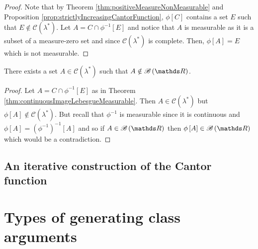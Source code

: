 \begin{proof}
Note that by Theorem \ref{thm:positiveMeasureNonMeasurable} and Proposition
\ref{prop:strictlyIncreasingCantorFunction}, $\phi\left[C\right]$
contains a set $E$ such that $E\notin\mathcal{C}\left(\lambda^{*}\right).$
Let $A=C\cap\phi^{-1}\left[E\right]$ and notice that $A$ is measurable
as it is a subset of a measure-zero set and since $\mathcal{C}\left(\lambda^{*}\right)$
is complete. Then, $\phi\left[A\right]=E$ which is not measurable.
\end{proof}
\begin{cor}
\label{cor:lebesgueNotBorel}There exists a set $A\in\mathcal{C}\left(\lambda^{*}\right)$
such that $A\notin\borel\left(\R\right)$.
\end{cor}

\begin{proof}
Let $A=C\cap\phi^{-1}\left[E\right]$ as in Theorem \ref{thm:continuousImageLebesgueMeasurable}.
Then $A\in\mathcal{C}\left(\lambda^{*}\right)$ but $\phi\left[A\right]\notin\mathcal{C}\left(\lambda^{*}\right).$
But recall that $\phi^{-1}$ is measurable since it is continuous
and $\phi\left[A\right]=\left(\phi^{-1}\right)^{-1}\left[A\right]$
and so if $A\in\borel\left(\R\right)$ then $\phi\left[A\right]\in\borel\left(\R\right)$
which would be a contradiction.
\end{proof}

\subsection{An iterative construction of the Cantor function}

\section{Types of generating class arguments\label{sec:genClassArgs}}

